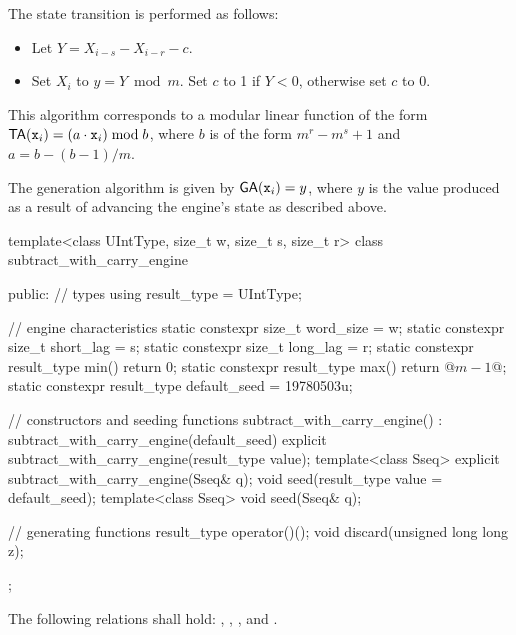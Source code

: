 \pnum
The state transition%
%
is performed as follows:
\begin{itemize}
 \item
   Let $Y = X_{i-s} - X_{i-r} - c$.
 \item
   Set $X_i$ to $y = Y \bmod m$.
   Set $c$ to 1 if $Y < 0$,
   otherwise set $c$ to 0.
\end{itemize}
\begin{note}
 This algorithm corresponds
 to a modular linear function
 of the form
 $\mathsf{TA}(\texttt{x}_{i}) = (a \cdot \texttt{x}_{i}) \bmod b$,
 where $b$ is of the form
 $m^r - m^s + 1$
 and $a = b - (b - 1) / m$.
\end{note}

\pnum
The generation algorithm%
%
is given by $\mathsf{GA}(\texttt{x}_{i}) = y$,
where $y$ is the value produced as a result
of advancing the engine's state as described above.

%
%
\begin{codeblock}
template<class UIntType, size_t w, size_t s, size_t r>
  class subtract_with_carry_engine {
  public:
    // types
    using result_type = UIntType;

    // engine characteristics
    static constexpr size_t word_size = w;
    static constexpr size_t short_lag = s;
    static constexpr size_t long_lag = r;
    static constexpr result_type min() { return 0; }
    static constexpr result_type max() { return @$m - 1$@; }
    static constexpr result_type default_seed = 19780503u;

    // constructors and seeding functions
    subtract_with_carry_engine() : subtract_with_carry_engine(default_seed) {}
    explicit subtract_with_carry_engine(result_type value);
    template<class Sseq> explicit subtract_with_carry_engine(Sseq& q);
    void seed(result_type value = default_seed);
    template<class Sseq> void seed(Sseq& q);

    // generating functions
    result_type operator()();
    void discard(unsigned long long z);
  };
\end{codeblock}

\pnum
The following relations shall hold:
  ,
  ,
  ,
and
  .

